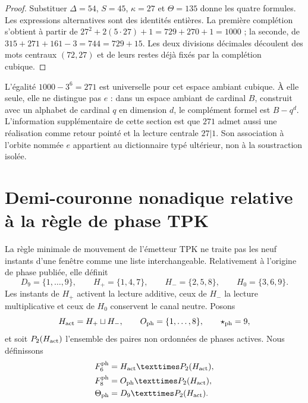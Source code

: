 \begin{proof}
Substituer \(\Delta=54\), \(S=45\), \(\kappa=27\) et
\(\Theta=135\) donne les quatre formules. Les expressions alternatives sont des
identités entières. La première complétion s'obtient à partir de
\(27^2+2(5\cdot27)+1=729+270+1=1000\) ; la seconde, de
\(315+271+161-3=744=729+15\). Les deux divisions décimales découlent des
mots centraux \((72,27)\) et de leurs restes déjà fixés par la
complétion cubique.
\end{proof}

L'égalité \(1000-3^6=271\) est universelle pour cet espace ambiant cubique. À elle
seule, elle ne distingue pas \(e\) : dans un espace ambiant de cardinal \(B\), construit avec
un alphabet de cardinal \(q\) en dimension \(d\), le complément formel est
\(B-q^d\). L'information supplémentaire de cette section est que \(271\) admet
aussi une réalisation comme retour pointé et la lecture centrale \(27|1\).
Son association à l'orbite nommée \(e\) appartient au dictionnaire typé
ultérieur, non à la soustraction isolée.

\section{Demi-couronne nonadique relative à la règle de phase TPK}

La règle minimale de mouvement de l'émetteur TPK ne traite pas les neuf instants d'une
fenêtre comme une liste interchangeable. Relativement à l'origine de phase
publiée, elle définit
\[
 D_9=\{1,\ldots,9\},
 \qquad
 H_+=\{1,4,7\},
 \qquad
 H_-=\{2,5,8\},
 \qquad
 H_0=\{3,6,9\}.
\]
Les instants de \(H_+\) activent la lecture additive, ceux de \(H_-\) la
lecture multiplicative et ceux de \(H_0\) conservent le canal neutre. Posons
\[
 H_{\rm act}=H_+\sqcup H_-,
 \qquad
 O_{\rm ph}=\{1,\ldots,8\},
 \qquad
 \star_{\rm ph}=9,
\]
et soit \(P_2(H_{\rm act})\) l'ensemble des paires non ordonnées de phases
actives. Nous définissons
\[
\begin{aligned}
 \mathcal F^{\rm ph}_6&=H_{\rm act}\times P_2(H_{\rm act}),\\
 \mathcal F^{\rm ph}_8&=O_{\rm ph}\times P_2(H_{\rm act}),\\
 \Theta_{\rm ph}&=D_9\times P_2(H_{\rm act}).
\end{aligned}
\]

